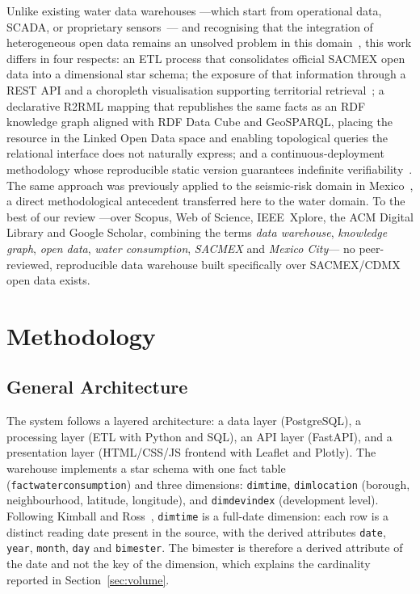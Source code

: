 \documentclass[runningheads]{llncs}
\renewcommand{\_}{\origunderscore\allowbreak}
\newif\ifshowchanges
\newcommand{\new}[1]{\ifshowchanges\textcolor{chg}{#1}\else#1\fi}
\begin{document}
Unlike existing water data warehouses ---which start from operational data,
SCADA, or proprietary sensors~\cite{soares2019,duque2014,abecker2014}--- and
recognising that the integration of heterogeneous open data remains an
unsolved problem in this domain~\cite{berro2015,vetro2016,quarati2023}, this work
differs in \new{four} respects: an ETL process that consolidates official SACMEX
open data into a dimensional star schema; the exposure of that information
through a REST API and a choropleth visualisation supporting territorial
retrieval~\cite{purves2018,han2019}; \new{a declarative R2RML mapping that
republishes the same facts as an RDF knowledge graph aligned with RDF Data Cube
and GeoSPARQL, placing the resource in the Linked Open Data space and enabling
topological queries the relational interface does not naturally express;} and a
continuous-deployment methodology whose reproducible static version guarantees
indefinite verifiability~\cite{sandve2013,hill2023}. The same approach was
previously applied to the seismic-risk domain in Mexico~\cite{villa2026}, a
direct methodological antecedent transferred here to the water domain. To the
best of our review ---over Scopus, Web of Science, IEEE~Xplore, the ACM Digital
Library and Google Scholar, combining the terms \emph{data warehouse},
\emph{knowledge graph}, \emph{open data}, \emph{water consumption},
\emph{SACMEX} and \emph{Mexico City}--- no peer-reviewed, reproducible data
warehouse built specifically over SACMEX/CDMX open data exists.

\section{Methodology}
\label{sec:met}

\subsection{General Architecture}

The system follows a layered architecture: a data layer (PostgreSQL), a
processing layer (ETL with Python and SQL), an API layer (FastAPI), and a
presentation layer (HTML/CSS/JS frontend with Leaflet and Plotly). The warehouse
implements a star schema with one fact table
(\texttt{fact\_water\_consumption}) and three dimensions:
\texttt{dim\_time}, \texttt{dim\_location} (borough, neighbourhood, latitude,
longitude), and \texttt{dim\_dev\_index} (development level).
\new{Following Kimball and Ross~\cite{kimball}, \texttt{dim\_time} is a
full-date dimension: each row is a distinct reading date present in the source,
with the derived attributes \texttt{date}, \texttt{year}, \texttt{month},
\texttt{day} and \texttt{bimester}. The bimester is therefore a derived
attribute of the date and not the key of the dimension, which explains the
cardinality reported in Section~\ref{sec:volume}.}
\end{document}
